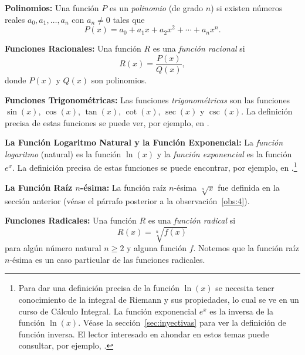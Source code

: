 \documentclass[12pt,a4paper]{book}
\begin{document}
    \textbf{Polinomios:} Una función $P$ es un \textit{polinomio} (de grado $n$) si existen
    números reales $a_{0},a_{1},\ldots,a_{n}$ con $a_{n}\neq 0$ tales que
    \begin{equation*}
        P(x)=a_{0}+a_{1}x+a_{2}x^{2}+\cdots+a_{n}x^{n}.
    \end{equation*}

    \textbf{Funciones Racionales:} Una función $R$ es una \textit{función racional} si
    \begin{equation*}
        R(x)=\frac{P(x)}{Q(x)},
    \end{equation*}
    donde $P(x)$ y $Q(x)$ son polinomios.

    \textbf{Funciones Trigonométricas:} Las funciones \textit{trigonométricas} son las
    funciones $\sin(x)$, $\cos(x)$, $\tan(x)$, $\cot(x)$, $\sec(x)$ y $\csc(x)$. La definición precisa
    de estas funciones se puede ver, por ejemplo, en \cite{nunez2020calculoII}.

    \textbf{La Función Logaritmo Natural y la Función Exponencial:} La \textit{función
    logaritmo} (natural) es la función $\ln(x)$ y la \textit{función exponencial} es la
    función $e^{x}$. La definición precisa de estas funciones se puede encontrar, por
    ejemplo, en \cite{nunez2020calculoII}.\footnote{Para dar una definición precisa de la función $\ln(x)$ se necesita tener conocimiento de
    la integral de Riemann y sus propiedades, lo cual se ve en un curso de Cálculo Integral.
    La función exponencial $e^{x}$ es la inversa de la función $\ln(x)$. Véase la sección~\ref{sec:inyectivas} para
    ver la definición de función inversa. El lector interesado en ahondar en estos temas puede
    consultar, por ejemplo, \cite{nunez2020calculoII}.}

    \textbf{La Función Raíz \boldmath$n$-ésima:} La función raíz $n$-ésima $\sqrt[n]{x}$ fue definida en
    la sección anterior (véase el párrafo posterior a la observación~\ref{obs:4}).

    \textbf{Funciones Radicales:} Una función $R$ es una \textit{función radical} si
    \begin{equation*}
        R(x)=\sqrt[n]{f(x)}
    \end{equation*}
    para algún número natural $n\geq 2$ y alguna función $f$. Notemos que la función
    raíz $n$-ésima es un caso particular de las funciones radicales.
\end{document}
